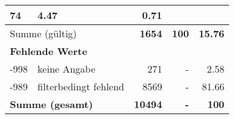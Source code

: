 \begin{longtable}{lXrrr}
       \num{74} &
       \num[round-mode=places,round-precision=2]{4.47} &
         \num[round-mode=places,round-precision=2]{0.71} \\
     \midrule
     \multicolumn{2}{l}{Summe (gültig)} &
       \textbf{\num{1654}} &
     \textbf{\num{100}} &
       \textbf{\num[round-mode=places,round-precision=2]{15.76}} \\
     \multicolumn{5}{l}{\textbf{Fehlende Werte}}\\
       -998 &
       keine Angabe &
         \num{271} &
        - &
         \num[round-mode=places,round-precision=2]{2.58} \\
       -989 &
       filterbedingt fehlend &
         \num{8569} &
        - &
         \num[round-mode=places,round-precision=2]{81.66} \\
     \midrule
     \multicolumn{2}{l}{\textbf{Summe (gesamt)}} &
          \textbf{\num{10494}} &
        \textbf{-} &
        \textbf{\num{100}} \\
     \bottomrule
     \end{longtable}
     
